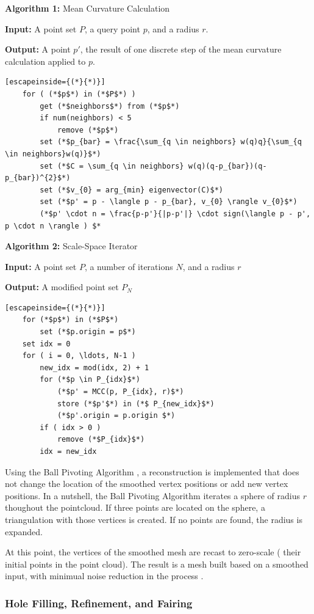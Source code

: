 \documentclass[12pt]{drexelthesis}
\let\Oldsubsubsection\subsubsection
\renewcommand{\subsubsection}{\FloatBarrier\Oldsubsubsection}
\begin{document}
\textbf{Algorithm 1:} Mean Curvature Calculation

  \textbf{Input:} A point set $P$, a query point $p$, and a radius $r$.
	
  \textbf{Output:} A point $p'$, the result of one discrete step of the mean curvature calculation applied to $p$.
\begin{lstlisting}[escapeinside={(*}{*)}]
	for ( (*$p$*) in (*$P$*) )
		get (*$neighbors$*) from (*$p$*)
		if num(neighbors) < 5
			remove (*$p$*)
		set (*$p_{bar} = \frac{\sum_{q \in neighbors} w(q)q}{\sum_{q \in neighbors}w(q)}$*)
		set (*$C = \sum_{q \in neighbors} w(q)(q-p_{bar})(q-p_{bar})^{2}$*)
		set (*$v_{0} = arg_{min} eigenvector(C)$*)
		set (*$p' = p - \langle p - p_{bar}, v_{0} \rangle v_{0}$*)
		(*$p' \cdot n = \frac{p-p'}{|p-p'|} \cdot sign(\langle p - p', p \cdot n \rangle ) $*	
\end{lstlisting}

\textbf{Algorithm 2:} Scale-Space Iterator

  \textbf{Input:} A point set $P$, a number of iterations $N$, and a radius $r$
	
  \textbf{Output:} A modified point set $P_{N}$


\begin{lstlisting}[escapeinside={(*}{*)}]
	for (*$p$*) in (*$P$*)
		set (*$p.origin = p$*)
	set idx = 0
	for ( i = 0, \ldots, N-1 )
		new_idx = mod(idx, 2) + 1
		for (*$p \in P_{idx}$*)
			(*$p' = MCC(p, P_{idx}, r)$*)
			store (*$p'$*) in (*$ P_{new_idx}$*)
			(*$p'.origin = p.origin $*)
		if ( idx > 0 )
			remove (*$P_{idx}$*)
		idx = new_idx
\end{lstlisting}

Using the Ball Pivoting Algorithm \cite{ballpivot}, a reconstruction is implemented that does not change the location of the smoothed vertex positions or add new vertex positions. In a nutshell, the Ball Pivoting Algorithm iterates a sphere of radius $r$ thoughout the pointcloud. If three points are located on the sphere, a triangulation with those vertices is created. If no points are found, the radius is expanded.

At this point, the vertices of the smoothed mesh are recast to zero-scale ( their initial points in the point cloud). The result is a mesh built based on a smoothed input, with minimual noise reduction in the process \cite{RN67}.

\subsubsection{Hole Filling, Refinement, and Fairing}
\label{subsec:holefill}
\end{document}
